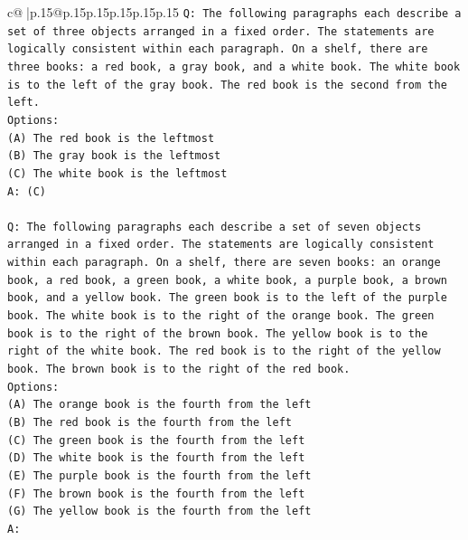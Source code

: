 \documentclass{article}
\begin{document}
{\begin{supertabular}{c@{$\;$}|p{.15\linewidth}@{}p{.15\linewidth}p{.15\linewidth}p{.15\linewidth}p{.15\linewidth}p{.15\linewidth}}
{{{\texttt{Q: The following paragraphs each describe a set of three objects arranged in a fixed order. The statements are logically consistent within each paragraph. On a shelf, there are three books: a red book, a gray book, and a white book. The white book is to the left of the gray book. The red book is the second from the left.} \\
\texttt{Options:} \\
\texttt{(A) The red book is the leftmost} \\
\texttt{(B) The gray book is the leftmost} \\
\texttt{(C) The white book is the leftmost} \\
\texttt{A: (C)} \\
\\ 
\texttt{Q: The following paragraphs each describe a set of seven objects arranged in a fixed order. The statements are logically consistent within each paragraph. On a shelf, there are seven books: an orange book, a red book, a green book, a white book, a purple book, a brown book, and a yellow book. The green book is to the left of the purple book. The white book is to the right of the orange book. The green book is to the right of the brown book. The yellow book is to the right of the white book. The red book is to the right of the yellow book. The brown book is to the right of the red book.} \\
\texttt{Options:} \\
\texttt{(A) The orange book is the fourth from the left} \\
\texttt{(B) The red book is the fourth from the left} \\
\texttt{(C) The green book is the fourth from the left} \\
\texttt{(D) The white book is the fourth from the left} \\
\texttt{(E) The purple book is the fourth from the left} \\
\texttt{(F) The brown book is the fourth from the left} \\
\texttt{(G) The yellow book is the fourth from the left} \\
\texttt{A:} \\
            }
        }
    }
     \\ \\


\end{supertabular}}
\end{document}
